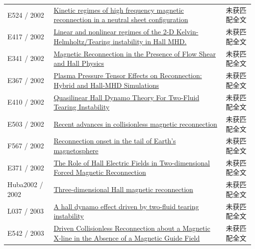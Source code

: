 \documentclass[UTF8,a4paper,11pt,openany,fontset=fandol]{ctexbook}
\begin{document}
\begin{longtable}{P{24mm}P{97mm}P{27mm}}
E524 / 2002 & \href{https://doi.org/10.1063/1.1435002}{Kinetic regimes of high frequency magnetic reconnection in a neutral sheet configuration} & 未获匹配全文\\

E417 / 2002 & \href{http://ui.adsabs.harvard.edu/abs/2002APS..DPPCP1016C/abstract}{Linear and nonlinear regimes of the 2-D Kelvin-Helmholtz/Tearing instability in Hall MHD.} & 未获匹配全文\\

E341 / 2002 & \href{http://ui.adsabs.harvard.edu/abs/2002AGUFMSM61A0444O/abstract}{Magnetic Reconnection in the Presence of Flow Shear and Hall Physics} & 未获匹配全文\\

E367 / 2002 & \href{https://ui.adsabs.harvard.edu/abs/2002APS..DPPUI1005Y/abstract}{Plasma Pressure Tensor Effects on Reconnection: Hybrid and Hall-MHD Simulations} & 未获匹配全文\\

E410 / 2002 & \href{https://ui.adsabs.harvard.edu/abs/2002APS..DPPCP1015M/abstract}{Quasilinear Hall Dynamo Theory For Two-Fluid Tearing Instability} & 未获匹配全文\\

E503 / 2002 & \href{https://doi.org/10.1088/0741-3335/44/12b/327}{Recent advances in collisionless magnetic reconnection} & 未获匹配全文\\

F567 / 2002 & \href{https://doi.org/10.1029/2001ja009148}{Reconnection onset in the tail of Earth's magnetosphere} & 未获匹配全文\\

E371 / 2002 & \href{http://ui.adsabs.harvard.edu/abs/2002AGUFMSM61A0467D/abstract}{The Role of Hall Electric Fields in Two-dimensional Forced Magnetic Reconnection} & 未获匹配全文\\

Huba2002 / 2002 & \href{https://doi.org/10.1063/1.1514970}{Three-dimensional Hall magnetic reconnection} & 未获匹配全文\\

L037 / 2003 & \href{https://doi.org/10.1134/1.1592555}{A hall dynamo effect driven by two-fluid tearing instability} & 未获匹配全文\\

E542 / 2003 & \href{http://citeseerx.ist.psu.edu/viewdoc/summary?doi=10.1.1.959.2557}{Driven Collisionless Reconnection about a Magnetic X-line in the Absence of a Magnetic Guide Field} & 未获匹配全文\\


\end{longtable}
\end{document}

